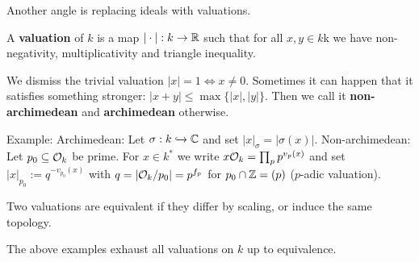\begin{outline}
\0 Another angle is replacing ideals with valuations. 

\0 \begin{definition}
    A \textbf{valuation} of $k$ is a map $|\cdot| : k\rightarrow \mathbb{R}$ such that for all $x,y\in k$k we have non-negativity, multiplicativity and triangle inequality.
\end{definition}

\1 We dismiss the trivial valuation $|x|=1 \iff x\neq 0$.
\1 Sometimes it can happen that it satisfies something stronger: $|x+y|\leq \max \{ |x|,|y|\}$. Then we call it \textbf{non-archimedean} and \textbf{archimedean} otherwise. 

\1 Example: 
    \2 Archimedean: Let $\sigma: k \xhookrightarrow{} \mathbb{C}$ and set $|x|_\sigma = |\sigma(x)|$.
    \2 Non-archimedean: Let $p_0 \subseteq \mathcal{O}_k$ be prime. For $x\in k^*$ we write $x\mathcal{O}_k = \prod_p p^{v_p(x)}$ and set $|x|_{p_0}:=q^{-v_{p_0}(x)}$ with $q=|\mathcal{O}_k / p_0|=p^{f_p}$ for $p_0 \cap \mathbb{Z} = (p)$ ($p$-adic valuation). 

\0 \begin{definition}
    Two valuations are equivalent if they differ by scaling, or induce the same topology.
\end{definition}

\0 \begin{theorem}
    The above examples exhaust all valuations on $k$ up to equivalence. 
\end{theorem}
\end{outline}



